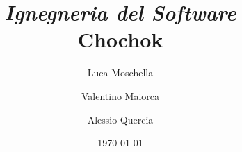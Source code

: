 \title{\emph{Ignegneria del Software}\\ \textbf{{Chochok}}}
\author{Luca Moschella \and Valentino Maiorca \and Alessio Quercia}
\date{ \today }
\maketitle